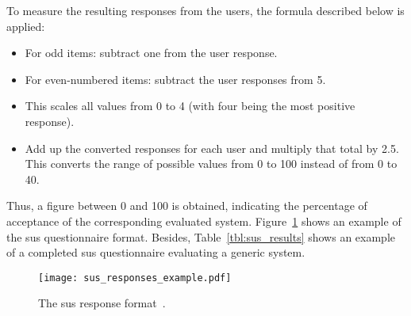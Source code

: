 To measure the resulting responses from the users, the formula described below
is applied: 

\begin{itemize}
 \item For odd items: subtract one from the user response.
 \item For even-numbered items: subtract the user responses from 5.
 \item This scales all values from 0 to 4 (with four being the most positive 
  response).
 \item Add up the converted responses for each user and multiply that total by 
  2.5. 
 This converts the range of possible values from 0 to 100 instead of from 0 to 
  40.
\end{itemize}

Thus, a figure between 0 and 100 is obtained, indicating the percentage of 
acceptance of the corresponding evaluated system. 
Figure~\ref{fig:sus_responses_example} shows an example of the \ac{sus} 
questionnaire format. Besides, Table~\ref{tbl:sus_results} shows an example of 
a completed \ac{sus} questionnaire evaluating a generic system. 

\begin{figure}
\centering
\texttt{[image: sus\_responses\_example.pdf]}
\caption{The \ac{sus} response format~\citep{vt100}.}
\label{fig:sus_responses_example}
\end{figure}


